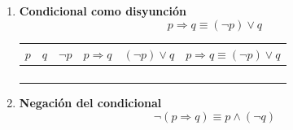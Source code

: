 \begin{enumerate}[label=\alph*)]
\begin{center}
	\renewcommand{\arraystretch}{1.4}
	\begin{tabular}{|c|c|c|c|c|c||c|}
		\hline
		$p$ & $q$ & $\lnot p$ & $\lnot q$ & $p \Rightarrow q$ & $\lnot q \Rightarrow \lnot p$ & $p \Rightarrow q \equiv \lnot q \Rightarrow \lnot p$ \\
		\hline
		\V & \V & \F & \F & \V & \V & \V \\
		\hline
		\V & \F & \F & \V & \F & \F & \V \\
		\hline
		\F & \V & \V & \F & \V & \V & \V \\
		\hline
		\F & \F & \V & \V & \V & \V & \V \\
		\hline
	\end{tabular}
\end{center}

\item \textbf{Condicional como disyunción}
\[p \Rightarrow q \equiv (\lnot p) \vee q\]

\begin{center}
	\renewcommand{\arraystretch}{1.4}
	\begin{tabular}{|c|c|c|c|c||c|}
		\hline
		$p$ & $q$ & $\lnot p$ & $p \Rightarrow q$ & $(\lnot p) \vee q$ & $p \Rightarrow q \equiv (\lnot p) \vee q$ \\
		\hline
		\V & \V & \F & \V & \V & \V \\
		\hline
		\V & \F & \F & \F & \F & \V \\
		\hline
		\F & \V & \V & \V & \V & \V \\
		\hline
		\F & \F & \V & \V & \V & \V \\
		\hline
	\end{tabular}
\end{center}

\item \textbf{Negación del condicional}
\[\lnot(p \Rightarrow q) \equiv p \land (\lnot q)\]


\end{enumerate}
